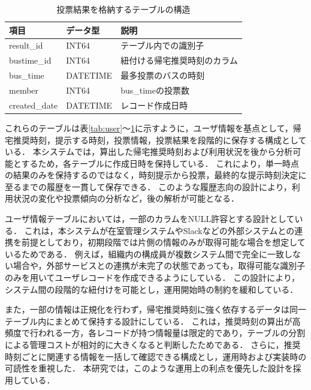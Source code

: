 \begin{table}[htb]
  \centering
  \caption{投票結果を格納するテーブルの構造}
  \label{tab:result}
  \begin{tabular}{|l|l|l|}
    \hline
    \textbf{項目}   & \textbf{データ型} & \textbf{説明}    \\
    \hline
    result\_id    & INT64         & テーブル内での識別子     \\
    bustime\_id   & INT64         & 紐付ける帰宅推奨時刻のカラム \\
    bus\_time     & DATETIME      & 最多投票のバスの時刻     \\
    member        & INT64         & bus\_timeの投票数  \\
    created\_date & DATETIME      & レコード作成日時       \\
    \hline
  \end{tabular}
\end{table}

これらのテーブルは表\ref{tab:user}〜\ref{tab:result}に示すように，ユーザ情報を基点として，帰宅推奨時刻，提示する時刻，投票情報，投票結果を段階的に保存する構成としている．
本システムでは，算出した帰宅推奨時刻および利用状況を後から分析可能とするため，各テーブルに作成日時を保持している．
これにより，単一時点の結果のみを保持するのではなく，時刻提示から投票，最終的な提示時刻決定に至るまでの履歴を一貫して保存できる．
このような履歴志向の設計により，利用状況の変化や投票傾向の分析など，後の解析が可能となる．

ユーザ情報テーブルにおいては，一部のカラムをNULL許容とする設計としている．
これは，本システムが在室管理システムやSlackなどの外部システムとの連携を前提としており，初期段階では片側の情報のみが取得可能な場合を想定しているためである．
例えば，組織内の構成員が複数システム間で完全に一致しない場合や，外部サービスとの連携が未完了の状態であっても，取得可能な識別子のみを用いてユーザレコードを作成できるようにしている．
この設計により，システム間の段階的な紐付けを可能とし，運用開始時の制約を緩和している．

また，一部の情報は正規化を行わず，帰宅推奨時刻に強く依存するデータは同一テーブル内にまとめて保持する設計にしている．
これは，推奨時刻の算出が高頻度で行われる一方，各レコードが持つ情報量は限定的であり，テーブルの分割による管理コストが相対的に大きくなると判断したためである．
さらに，推奨時刻ごとに関連する情報を一括して確認できる構成とし，運用時および実装時の可読性を重視した．
本研究では，このような運用上の利点を優先した設計を採用している．